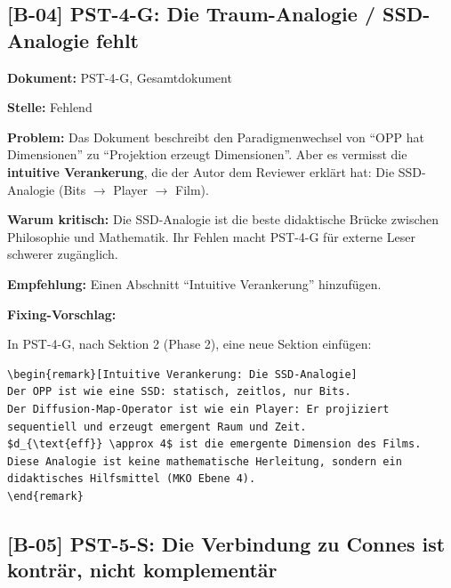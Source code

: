 \documentclass[11pt,a4paper]{article}
\newcommand{\B}[1]{\textbf{[B-#1]}}
\newcommand{\Dok}[1]{\noindent\textbf{Dokument:} #1\par\smallskip}
\newcommand{\Stelle}[1]{\noindent\textbf{Stelle:} #1\par\smallskip}
\newcommand{\Prob}[1]{\noindent\textbf{Problem:} #1\par\smallskip}
\newcommand{\Krit}[1]{\noindent\textbf{Warum kritisch:} #1\par\smallskip}
\newcommand{\Empf}[1]{\noindent\textbf{Empfehlung:} #1\par\smallskip}
\newenvironment{Fix}
  {\par\medskip\noindent\textbf{Fixing-Vorschlag:}\par\nobreak\smallskip}
  {\par\medskip}
\begin{document}
\subsection{\B{04} PST-4-G: Die Traum-Analogie / SSD-Analogie fehlt}

\Dok{PST-4-G, Gesamtdokument}
\Stelle{Fehlend}
\Prob{Das Dokument beschreibt den Paradigmenwechsel von ``OPP hat
Dimensionen'' zu ``Projektion erzeugt Dimensionen''. Aber es
vermisst die \textbf{intuitive Verankerung}, die der Autor dem
Reviewer erklärt hat: Die SSD-Analogie (Bits $\to$ Player $\to$
Film).}
\Krit{Die SSD-Analogie ist die beste didaktische Brücke zwischen
Philosophie und Mathematik. Ihr Fehlen macht PST-4-G für externe
Leser schwerer zugänglich.}
\Empf{Einen Abschnitt ``Intuitive Verankerung'' hinzufügen.}
\begin{Fix}
In PST-4-G, nach Sektion 2 (Phase 2), eine neue Sektion
einfügen:
\begin{verbatim}
\begin{remark}[Intuitive Verankerung: Die SSD-Analogie]
Der OPP ist wie eine SSD: statisch, zeitlos, nur Bits.
Der Diffusion-Map-Operator ist wie ein Player: Er projiziert
sequentiell und erzeugt emergent Raum und Zeit.
$d_{\text{eff}} \approx 4$ ist die emergente Dimension des Films.
Diese Analogie ist keine mathematische Herleitung, sondern ein
didaktisches Hilfsmittel (MKO Ebene 4).
\end{remark}
\end{verbatim}
\end{Fix}

\subsection{\B{05} PST-5-S: Die Verbindung zu Connes ist konträr,
nicht komplementär}
\end{document}
